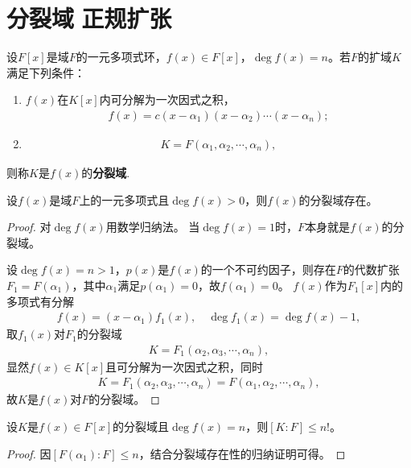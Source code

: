 \documentclass[../../main.tex]{subfiles}%
\begin{document}
\section{分裂域$\,\,$正规扩张}

\begin{definition}
设$F[x]$是域$F$的一元多项式环，$f(x)\in F[x]$，$\deg f(x)=n$。若$F$的扩域$K$满足下列条件：
\begin{enumerate}[(1)]
\item $f(x)$在$K[x]$内可分解为一次因式之积，
\begin{align}
f(x)=c(x-\alpha_1)(x-\alpha_2)\cdots(x-\alpha_n);\label{eq:split-fact}
\end{align}
\item \begin{align}K=F(\alpha_1,\alpha_2,\cdots,\alpha_n),\label{eq:split-gen}
\end{align}
\end{enumerate}
则称$K$是$f(x)$的\textbf{分裂域}.
\end{definition}

\begin{theorem}
设$f(x)$是域$F$上的一元多项式且$\deg f(x)>0$，则$f(x)$的分裂域存在。
\end{theorem}
\begin{proof}
对$\deg f(x)$用数学归纳法。
当$\deg f(x)=1$时，$F$本身就是$f(x)$的分裂域。

设$\deg f(x)=n>1$，$p(x)$是$f(x)$的一个不可约因子，则存在$F$的代数扩张$F_1=F(\alpha_1)$，其中$\alpha_1$满足$p(\alpha_1)=0$，故$f(\alpha_1)=0$。
$f(x)$作为$F_1[x]$内的多项式有分解
\begin{align*}
f(x)=(x-\alpha_1)f_1(x),\quad \deg f_1(x)=\deg f(x)-1,
\end{align*}
取$f_1(x)$对$F_1$的分裂域
\begin{align*}
K=F_1(\alpha_2,\alpha_3,\cdots,\alpha_n),
\end{align*}
显然$f(x)\in K[x]$且可分解为一次因式之积，同时
\begin{align*}
K=F_1(\alpha_2,\alpha_3,\cdots,\alpha_n)=F(\alpha_1,\alpha_2,\cdots,\alpha_n),
\end{align*}
故$K$是$f(x)$对$F$的分裂域。
\end{proof}

\begin{corollary}
设$K$是$f(x)\in F[x]$的分裂域且$\deg f(x)=n$，则$[K:F]\leqslant n!$。
\end{corollary}

\begin{proof}
因$[F(\alpha_1):F]\leqslant n$，结合分裂域存在性的归纳证明可得。
\end{proof}
\end{document}
